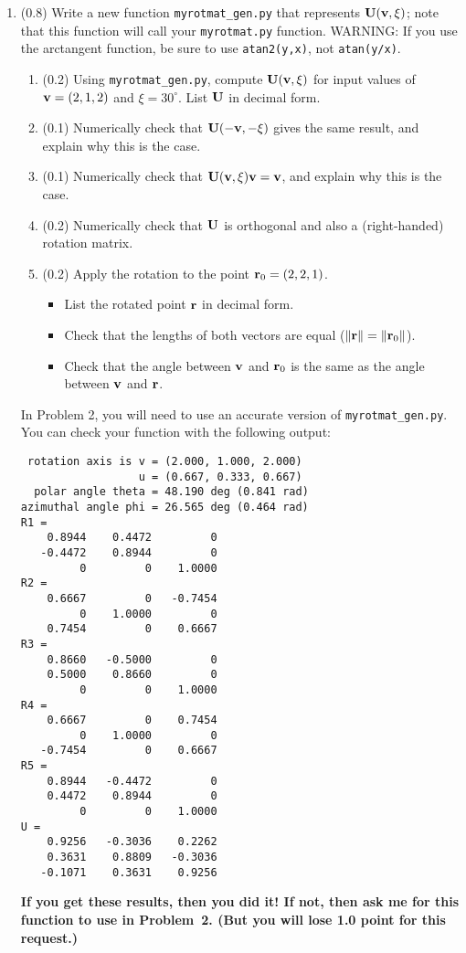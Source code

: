 \documentclass[11pt,titlepage,fleqn]{article}
\newcommand{\rotangB}{\xi}    %
\newcommand{\rotvec}{\bv}      %
\begin{document}
\begin{enumerate}
\item (0.8) Write a new function \verb+myrotmat_gen.py+ that represents $\bU(\rotvec,\rotangB)$; note that this function will call your \verb+myrotmat.py+ function. WARNING: If you use the arctangent function, be sure to use \verb+atan2(y,x)+, not \verb+atan(y/x)+.
%
\begin{enumerate}
\item (0.2) Using \verb+myrotmat_gen.py+, compute $\bU(\rotvec,\rotangB)$ for input values of $\rotvec = (2,1,2)$ and $\rotangB = 30^\circ$. List $\mbox{${\bf U}$}$ in decimal form.
\item (0.1) Numerically check that $\bU(-\rotvec,-\rotangB)$ gives the same result, and explain why this is the case.
\item (0.1) Numerically check that $\bU(\rotvec,\rotangB)\rotvec = \rotvec$, and explain why this is the case.
\item (0.2) Numerically check that $\mbox{${\bf U}$}$ is orthogonal and also a (right-handed) rotation matrix.
\item (0.2) Apply the rotation to the point $\mbox{${\bf r}$}_0 = (2,2,1)$.
%
\begin{itemize}
\item List the rotated point $\mbox{${\bf r}$}$ in decimal form.
\item Check that the lengths of both vectors are equal ($\|\mbox{${\bf r}$}\| = \|\mbox{${\bf r}$}_0\|$).
\item Check that the angle between $\rotvec$ and $\mbox{${\bf r}$}_0$ is the same as the angle between  $\rotvec$ and $\mbox{${\bf r}$}$.
\end{itemize}
\end{enumerate}
%
In Problem 2, you will need to use an accurate version of \verb+myrotmat_gen.py+. You can check your function with the following output:
%
\begin{spacing}{1.0}
\begin{verbatim}
 rotation axis is v = (2.000, 1.000, 2.000)
                  u = (0.667, 0.333, 0.667)
  polar angle theta = 48.190 deg (0.841 rad)
azimuthal angle phi = 26.565 deg (0.464 rad)
R1 =
    0.8944    0.4472         0
   -0.4472    0.8944         0
         0         0    1.0000
R2 =
    0.6667         0   -0.7454
         0    1.0000         0
    0.7454         0    0.6667
R3 =
    0.8660   -0.5000         0
    0.5000    0.8660         0
         0         0    1.0000
R4 =
    0.6667         0    0.7454
         0    1.0000         0
   -0.7454         0    0.6667
R5 =
    0.8944   -0.4472         0
    0.4472    0.8944         0
         0         0    1.0000
U =
    0.9256   -0.3036    0.2262
    0.3631    0.8809   -0.3036
   -0.1071    0.3631    0.9256
\end{verbatim}
\end{spacing}
%
{\bf If you get these results, then you did it! If not, then ask me for this function to use in Problem~2. (But you will lose 1.0 point for this request.)}


\end{enumerate}
\end{document}
